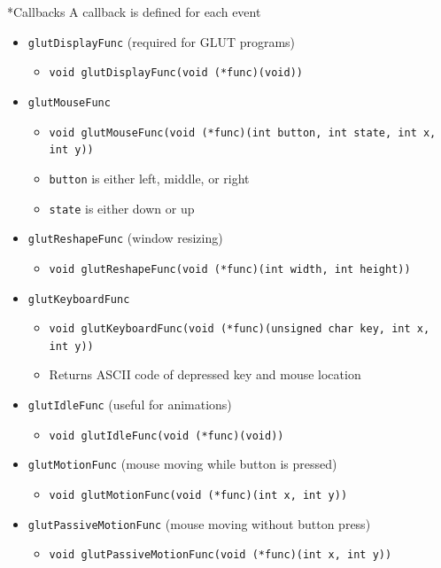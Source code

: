 \documentclass[a4paper]{article}
\makeatletter
\renewcommand{\subsection}{
  \@startsection{subsection}{2}{0pt}{1ex}{1.2ex} {\raggedleft\normalfont\normalsize\bfseries\fbox}}
\newcommand{\ic}[1]{\lstinline{#1}}
\makeatother
\begin{document}
\begin{multicols*}{3}
  \subsection*{Callbacks} \noindent
    A callback is defined for each event
    \begin{itemize}[leftmargin=*]
      \item \ic{glutDisplayFunc} (required for GLUT programs)
        \begin{itemize}[leftmargin=*]
          \item \ic{void glutDisplayFunc(void (*func)(void))}
        \end{itemize}
      \item \ic{glutMouseFunc}
        \begin{itemize}[leftmargin=*]
          \item \ic{void glutMouseFunc(void (*func)(int button, int state, int x, int y))}
          \item \ic{button} is either left, middle, or right
          \item \ic{state} is either down or up
        \end{itemize}
      \item \ic{glutReshapeFunc} (window resizing)
        \begin{itemize}[leftmargin=*]
          \item \ic{void glutReshapeFunc(void (*func)(int width, int height))}
        \end{itemize}
      \item \ic{glutKeyboardFunc}
        \begin{itemize}[leftmargin=*]
          \item \ic{void glutKeyboardFunc(void (*func)(unsigned char key, int x, int y))}
          \item Returns ASCII code of depressed key and mouse location
        \end{itemize}
      \item \ic{glutIdleFunc} (useful for animations)
        \begin{itemize}[leftmargin=*]
          \item \ic{void glutIdleFunc(void (*func)(void))}
        \end{itemize}
      \item \ic{glutMotionFunc} (mouse moving while button is pressed)
        \begin{itemize}[leftmargin=*]
          \item \ic{void glutMotionFunc(void (*func)(int x, int y))}
        \end{itemize}
      \item \ic{glutPassiveMotionFunc} (mouse moving without button press)
        \begin{itemize}[leftmargin=*]
          \item \ic{void glutPassiveMotionFunc(void (*func)(int x, int y))}
        \end{itemize}
    \end{itemize}

\end{multicols*}
\end{document}
